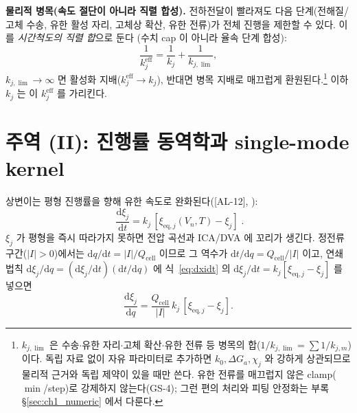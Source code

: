 \documentclass[11pt,a4paper]{article}
\newcommand{\dd}{\mathrm{d}}
\newcommand{\eff}{\mathrm{eff}}
\newcommand{\eq}{\mathrm{eq}}
\newcommand{\cell}{\mathrm{cell}}
\newcommand{\AL}[1]{\textsf{[AL-#1]}}
\begin{document}
\textbf{물리적 병목(속도 절단이 아니라 직렬 합성).} 전하전달이 빨라져도 다음 단계(전해질/고체 수송, 유한
활성 자리, 고체상 확산, 유한 전류)가 전체 진행을 제한할 수 있다. 이를 \emph{시간척도의 직렬 합}으로 둔다
(수치 cap 이 아니라 율속 단계 합성):
\begin{equation}
\frac{1}{k_j^{\eff}}=\frac{1}{k_j}+\frac{1}{k_{j,\lim}},
\label{eq:kphys}
\end{equation}
$k_{j,\lim}\to\infty$ 면 활성화 지배($k_j^{\eff}\to k_j$), 반대면 병목 지배로 매끄럽게 환원된다.\footnote{%
$k_{j,\lim}$ 은 수송$\cdot$유한 자리$\cdot$고체 확산$\cdot$유한 전류 등 병목의 합($1/k_{j,\lim}=\sum 1/k_{j,m}$)
이다. 독립 자료 없이 자유 파라미터로 추가하면 $k_0,\Delta G_a,\chi_j$ 와 강하게 상관되므로 물리적 근거와
독립 제약이 있을 때만 쓴다. 유한 전류를 매끄럽지 않은 clamp($\min$/step)로 강제하지 않는다(GS-4); 그런
편의 처리와 피팅 안정화는 부록 \S\ref{sec:ch1_numeric} 에서 다룬다.} 이하 $k_j$ 는 이 $k_j^{\eff}$ 를 가리킨다.

\section{주역 (II): 진행률 동역학과 single-mode kernel}\label{sec:dyn}
상변이는 평형 진행률을 향해 유한 속도로 완화된다(\AL{12}, \cite{onsager1931,degrootmazur1962}):
\begin{equation}
\boxed{\;\frac{\dd\xi_j}{\dd t}=k_j\,[\xi_{\eq,j}(V_n,T)-\xi_j]\;.}
\label{eq:dxidt}
\end{equation}
$\xi_j$ 가 평형을 즉시 따라가지 못하면 전압 곡선과 ICA/DVA 에 꼬리가 생긴다. 정전류 구간($|I|>0$)에서는
$\dd q/\dd t=|I|/Q_\cell$ 이므로 그 역수가 $\dd t/\dd q=Q_\cell/|I|$ 이고, 연쇄법칙
$\dd\xi_j/\dd q=(\dd\xi_j/\dd t)(\dd t/\dd q)$ 에 식~\eqref{eq:dxidt} 의 $\dd\xi_j/\dd t=k_j[\xi_{\eq,j}-\xi_j]$
를 넣으면
\begin{equation}
\frac{\dd\xi_j}{\dd q}=\frac{Q_\cell}{|I|}\,k_j\,[\xi_{\eq,j}-\xi_j].
\label{eq:dxidq}
\end{equation}
\end{document}
